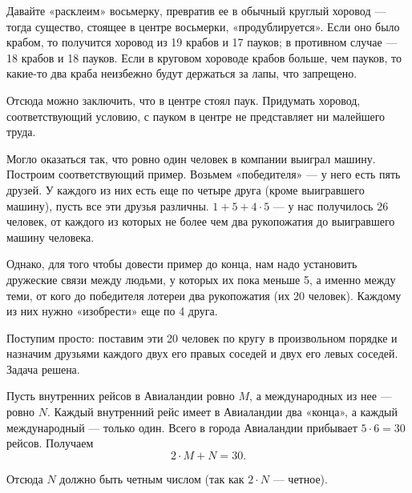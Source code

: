 ﻿
\begin{itemize}
\itA Давайте «расклеим» восьмерку, превратив ее в обычный круглый хоровод — тогда существо, стоящее в центре восьмерки, «продублируется». Если оно было крабом, то получится хоровод из 19 крабов и 17 пауков; в противном случае — 18 крабов и 18 пауков. Если в круговом хороводе крабов больше, чем пауков, то какие-то два краба неизбежно будут держаться за лапы, что запрещено.

\ms Отсюда можно заключить, что в центре стоял паук. Придумать хоровод, соответствующий условию, с пауком в центре не представляет ни малейшего труда.

\itB Могло оказаться так, что ровно один человек в компании выиграл машину. Построим соответствующий пример. Возьмем «победителя» — у него есть пять друзей. У каждого из них есть еще по четыре друга (кроме выигравшего машину), пусть все эти друзья различны. $1+5+4 \cdot 5$ — у нас получилось 26 человек, от каждого из которых не более чем два рукопожатия до выигравшего машину человека.

\ms Однако, для того чтобы довести пример до конца, нам надо установить дружеские связи между людьми, у которых их пока меньше 5, а именно между теми, от кого до победителя лотереи два рукопожатия (их 20 человек). Каждому из них нужно «изобрести» еще по 4 друга.

\ms Поступим просто: поставим эти 20 человек по кругу в произвольном порядке и назначим друзьями каждого двух его правых соседей и двух его левых соседей. Задача решена.

\itC Пусть внутренних рейсов в Авиаландии ровно $M$, а международных из нее — ровно $N$. Каждый внутренний рейс имеет в Авиаландии два «конца», а каждый международный — только один. Всего в города Авиаландии прибывает $5 \cdot 6 = 30$ рейсов. Получаем
	$$2 \cdot M + N = 30.$$

Отсюда $N$ должно быть четным числом (так как $2 \cdot N$ — четное).
\end{itemize}